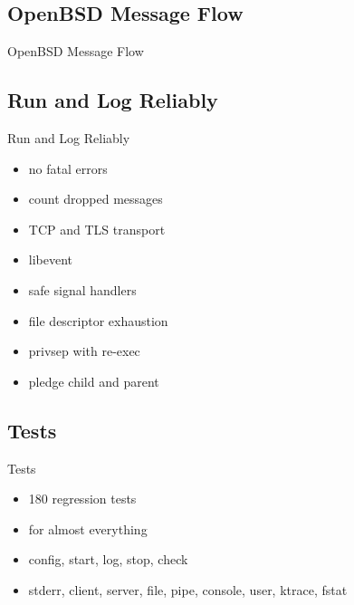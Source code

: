 \documentclass[14pt]{beamer}
\begin{document}
\subsection{OpenBSD Message Flow}
\begin{frame}{OpenBSD Message Flow}
\end{frame}

\subsection{Run and Log Reliably}
\begin{frame}{Run and Log Reliably}
\begin{itemize}
    \item no fatal errors
    \item count dropped messages
    \item TCP and TLS transport
    \item libevent
    \item safe signal handlers
    \item file descriptor exhaustion
    \item privsep with re-exec
    \item pledge child and parent
\end{itemize}
\end{frame}

\subsection{Tests}
\begin{frame}{Tests}
\begin{itemize}
    \item 180 regression tests
    \item for almost everything
    \item config, start, log, stop, check
    \item stderr, client, server, file, pipe, console, user, ktrace, fstat
\end{itemize}
\end{frame}
\end{document}
